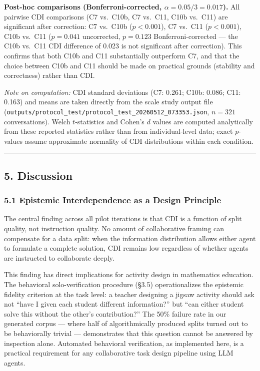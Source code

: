 \documentclass[
  11pt,
]{article}
\begin{document}
\textbf{Post-hoc comparisons (Bonferroni-corrected, $\alpha = 0.05/3 = 0.017$).} All pairwise CDI comparisons (C7 vs.\ C10b, C7 vs.\ C11, C10b vs.\ C11) are significant after correction: C7 vs.\ C10b ($p < 0.001$), C7 vs.\ C11 ($p < 0.001$), C10b vs.\ C11 ($p = 0.041$ uncorrected, $p = 0.123$ Bonferroni-corrected --- the C10b vs.\ C11 CDI difference of 0.023 is not significant after correction). This confirms that both C10b and C11 substantially outperform C7, and that the choice between C10b and C11 should be made on practical grounds (stability and correctness) rather than CDI.

\emph{Note on computation:} CDI standard deviations (C7: 0.261; C10b: 0.086; C11: 0.163) and means are taken directly from the scale study output file (\texttt{outputs/protocol\_test/protocol\_test\_20260512\_073353.json}, $n=321$ conversations). Welch $t$-statistics and Cohen's $d$ values are computed analytically from these reported statistics rather than from individual-level data; exact $p$-values assume approximate normality of CDI distributions within each condition.

\begin{center}\rule{0.5\linewidth}{0.5pt}\end{center}

\subsection{5. Discussion}\label{discussion}

\subsubsection{5.1 Epistemic Interdependence as a Design
Principle}\label{epistemic-interdependence-as-a-design-principle}

The central finding across all pilot iterations is that CDI is a
function of split quality, not instruction quality. No amount of
collaborative framing can compensate for a data split: when the
information distribution allows either agent to formulate a complete
solution, CDI remains low regardless of whether agents are instructed to
collaborate deeply.

This finding has direct implications for activity design in mathematics education. The behavioral solo-verification procedure (§3.5) operationalizes the epistemic fidelity criterion at the task level: a teacher designing a jigsaw activity should ask not ``have I given each student different information?'' but ``can either student solve this without the other's contribution?'' The 50\% failure rate in our generated corpus --- where half of algorithmically produced splits turned out to be behaviorally trivial --- demonstrates that this question cannot be answered by inspection alone. Automated behavioral verification, as implemented here, is a practical requirement for any collaborative task design pipeline using LLM agents.
\end{document}
